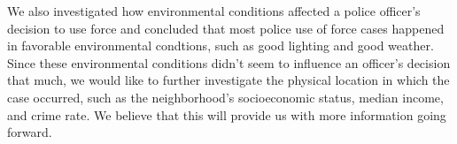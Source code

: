 \documentclass[10pt]{article}
\begin{document}
We also investigated how environmental conditions affected a police officer's decision to use force and concluded that most police use of force cases happened in favorable environmental condtions, such as good lighting and good weather. Since these environmental conditions didn't seem to influence an officer's decision that much, we would like to further investigate the physical location in which the case occurred, such as the neighborhood's socioeconomic status, median income, and crime rate. We believe that this will provide us with more information going forward.
\end{document}

